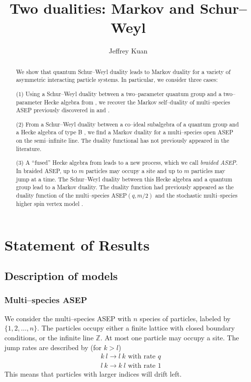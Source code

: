 \documentclass[12pt]{ximera}
\title{Two dualities: Markov and Schur--Weyl}
\begin{document}
\begin{abstract}
We show that quantum Schur--Weyl duality leads to Markov duality for a variety of asymmetric interacting particle systems. In particular, we consider three cases:

(1) Using a Schur--Weyl duality between a two--parameter quantum group and a two--parameter Hecke algebra from \cite{BW}, we recover the Markov self--duality of multi--species ASEP previously discovered in \cite{KIMRN} and \cite{BS3}.

(2) From a Schur--Weyl duality between a co--ideal subalgebra of a quantum group and a Hecke algebra of type B \cite{BWW}, we find a Markov duality for a multi--species open ASEP on the semi--infinite line. The duality functional has not previously appeared in the literature.

(3) A ``fused'' Hecke algebra from \cite{crampe2020fused} leads to a new process, which we call \textit{braided ASEP}.  In braided ASEP, up to $m$ particles may occupy a site and up to $m$ particles may jump at a time. The Schur--Weyl duality between this Hecke algebra and a quantum group lead to a Markov duality. The duality function had previously appeared as the duality function of the multi--species ASEP$(q,m/2)$ \cite{KIMRN} and the stochastic multi--species higher spin vertex model \cite{KuanCMP}.
\end{abstract}

\author{Jeffrey Kuan}



\date{}

\maketitle


\section{Statement of Results}

\subsection{Description of models}

\subsubsection{Multi--species ASEP}
We consider the multi--species ASEP with $n$ species of particles, labeled by $\{1,2,\ldots,n\}$. The particles occupy either a finite lattice with closed boundary conditions, or the infinite line $\mathbb{Z}$. At most one particle may occupy a site. The jump rates are described by (for $k>l$)
\begin{align*}
&k \ l \rightarrow l \ k \text{ with rate } q\\
&l \ k \rightarrow k \ l \text{ with rate } 1
\end{align*}
This means that particles with larger indices will drift left.
\end{document}
